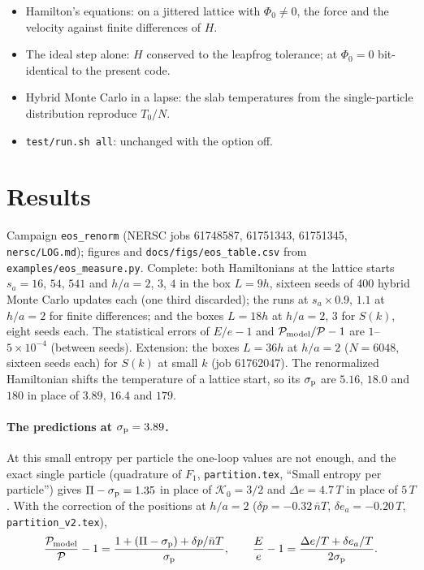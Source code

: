 \documentclass[11pt,aps,preprint,nofootinbib,superscriptaddress,tightenlines]{revtex4-2}
\def\pr{{\mathcal P}}
\def\er{e}
\def\st{\begin{equation}}
\def\stp{\end{equation}}
\let\oldparagraph\paragraph
\renewcommand{\paragraph}{\par\bigskip\oldparagraph}
\begin{document}
\begin{itemize}
\item Hamilton's equations: on a jittered lattice with $\Phi_0\neq0$, the force and the velocity against finite differences of $H$.
\item The ideal step alone: $H$ conserved to the leapfrog tolerance; at $\Phi_0=0$ bit-identical to the present code.
\item Hybrid Monte Carlo in a lapse: the slab temperatures from the single-particle distribution reproduce $T_0/N$.
\item \texttt{test/run.sh all}: unchanged with the option off.
\end{itemize}

\section{Results}
\label{sec:results}

Campaign \texttt{eos\_renorm} (NERSC jobs 61748587, 61751343, 61751345, \texttt{nersc/LOG.md}); figures and \texttt{docs/figs/eos\_table.csv} from
\texttt{examples/eos\_measure.py}.  Complete: both Hamiltonians at the lattice starts $s_a=16$, $54$, $541$ and $h/a=2$, $3$, $4$ in the box $L=9h$, sixteen seeds of
400 hybrid Monte Carlo updates each (one third discarded); the runs at $s_a\times0.9$, $1.1$ at $h/a=2$ for finite differences; and the boxes $L=18h$ at $h/a=2$, $3$
for $S(k)$, eight seeds each.  The statistical errors of $E/\er-1$ and $\pr_{\rm model}/\pr-1$ are $1$--$5\times10^{-4}$ (between seeds).  Extension: the boxes
$L=36h$ at $h/a=2$ ($N=6048$, sixteen seeds each) for $S(k)$ at small $k$ (job 61762047).  The renormalized Hamiltonian shifts the temperature of a lattice start, so its $\sigma_{\rm p}$ are $5.16$, $18.0$ and
$180$ in place of $3.89$, $16.4$ and $179$.

\paragraph{The predictions at $\sigma_{\rm p}=3.89$.}  At this small entropy per particle the one-loop values are not enough, and the exact single particle
(quadrature of $F_1$, \texttt{partition.tex}, ``Small entropy per particle'') gives $\Pi-\sigma_{\rm p}=1.35$ in place of $\mathcal K_0=3/2$ and $\Delta e=4.7\,T$ in place of $5\,T$.
With the correction of the positions at $h/a=2$ ($\delta p=-0.32\,\bar nT$, $\delta e_a=-0.20\,T$, \texttt{partition\_v2.tex}),
\st
\frac{\pr_{\rm model}}{\pr}-1=\frac{1+(\Pi-\sigma_{\rm p})+\delta p/\bar nT}{\sigma_{\rm p}},\qquad
\frac{E}{\er}-1=\frac{\Delta e/T+\delta e_a/T}{2\sigma_{\rm p}} .
\stp
\end{document}
